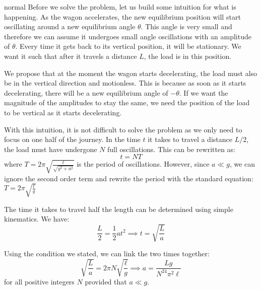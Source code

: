 \begin{solution}{normal}
Before we solve the problem, let us build some intuition for what is happening. As the wagon accelerates, the new equilibrium position will start oscillating around a new equilibrium angle $\theta$. This angle is very small and therefore we can assume it undergoes small angle oscillations with an amplitude of $\theta$. Every time it gets back to its vertical position, it will be stationary. We want it such that after it travels a distance $L$, the load is in this position.
\vspace{3mm}

We propose that at the moment the wagon starts decelerating, the load must also be in the vertical direction and motionless. This is because as soon as it starts decelerating, there will be a new equilibrium angle of $-\theta$. If we want the magnitude of the amplitudes to stay the same, we need the position of the load to be vertical as it starts decelerating.
\vspace{3mm}

With this intuition, it is not difficult to solve the problem as we only need to focus on one half of the journey. In the time $t$ it takes to travel a distance $L/2$, the load must have undergone $N$ full oscillations. This can be rewritten as:
$$t=NT$$
where $T=2\pi\sqrt{\frac{\ell}{\sqrt{g^2+a^2}}}$ is the period of oscillations. However, since $a \ll g$, we can ignore the second order term and rewrite the period with the standard equation: $T=2\pi\sqrt{\frac{\ell}{g}}$
\vspace{3mm} 

The time it takes to travel half the length can be determined using simple kinematics. We have:
$$\frac{L}{2} = \frac{1}{2}at^2 \implies t = \sqrt{\frac{L}{a}}$$
\vspace{3mm}

Using the condition we stated, we can link the two times together:
$$\sqrt{\frac{L}{a}} = 2\pi N\sqrt{\frac{\ell}{g}} \implies \boxed{a = \frac{Lg}{N^24\pi^2\ell}}$$
for all positive integers $N$ provided that $a \ll g$.
\end{solution}
